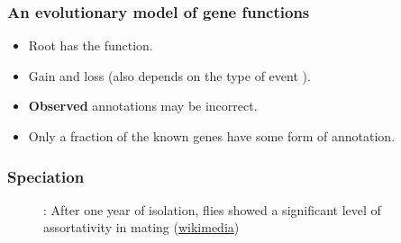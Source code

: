 \documentclass[aspectratio=169, 9pt, handout]{beamer}
\begin{document}
\begin{frame}[label=aphylographicalview-altview,c]
	\frametitle{An evolutionary model of gene functions}
	\def\shadowsize{2pt}
	
	\begin{minipage}[m]{.60\linewidth}
		\begin{figure}
			\footnotesize
			\centering
			\def\svgwidth{.9\linewidth}
		\end{figure}
	\end{minipage}
	\hfill
	\begin{minipage}[m]{.38\linewidth}
		\pause
		\begin{itemize}
			\item \textcolor{rootnode}{Root has the function.}\pause[4]
			\item \textcolor{innernode}{Gain\pause{} and loss\pause{} (also depends on the type of event \hyperlink{duplicationvsspeciation}{}}).\pause
			\item \textcolor{leafnode}{\textbf{Observed} annotations may be incorrect.}\pause
			\item Only a fraction of the known genes have some form of annotation.
		\end{itemize}
		\vfill\hfill\hyperlink{aphylographicalview}{}
	\end{minipage}
	
\end{frame}


\begin{frame}[label = duplicationvsspeciation]
\frametitle{Speciation}
\begin{figure}
\centering
\def\svgwidth{.8\linewidth}
\tiny

\caption{\cite{Dodd1989}: After one year of isolation, flies showed a significant level of assortativity in mating (\href{https://commons.wikimedia.org/wiki/File:Drosophila_speciation_experiment.svg}{wikimedia})}
\end{figure}

\vfill\hfill \hyperlink{aphylographicalview}{}

\end{frame}
\end{document}
